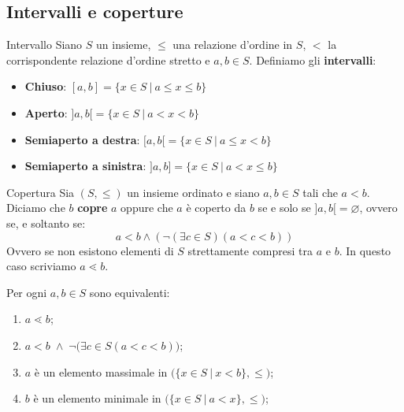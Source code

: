 \subsection{Intervalli e coperture}
\begin{defbox}{Intervallo}
	Siano $S$ un insieme, $\leq$ una relazione d'ordine in $S$, $<$ la corrispondente relazione d'ordine stretto e $a,b \in S$. Definiamo gli \textbf{intervalli}:
	\begin{itemize}
		\item \textbf{Chiuso}: $[a,b] = \{x \in S \ | \ a \leq x \leq b\}$
		\item \textbf{Aperto}: $]a,b[=\{x \in S \ | \ a < x < b\}$
		\item \textbf{Semiaperto a destra}: $[a,b[=\{x \in S \ | \ a \leq x < b\}$
		\item \textbf{Semiaperto a sinistra}: $]a,b]=\{x \in S \ | \ a < x \leq b\}$
	\end{itemize}
\end{defbox}

\begin{defbox}{Copertura}
	Sia $(S,\leq)$ un insieme ordinato e siano $a,b \in S$ tali che $a < b$.	Diciamo che $b$ \textbf{copre} $a$ oppure che $a$ è coperto da $b$ se e solo se $]a,b[= \varnothing$, ovvero se, e soltanto se:
	\begin{displaymath}
		a < b \land (\neg(\exists c \in S)(a < c < b))
	\end{displaymath}
	Ovvero se non esistono elementi di $S$ strettamente compresi tra $a$ e $b$. In questo caso scriviamo $a \lessdot b$.
\end{defbox}

\begin{lemmabox}
	Per ogni $a,b \in S$ sono equivalenti:
	\begin{enumerate}
		\item $a \lessdot b$;
		\item $a <b \; \wedge \; \neg\bigl(\exists c \in S (a <c<b)\bigr)$;
		\item $a$ è un elemento massimale in $\bigl(\{x \in S \ | \ x < b\}, \leq \bigr)$;
		\item $b$ è un elemento minimale in $\bigl(\{x \in S \ | \ a < x\}, \leq\bigr)$;
	\end{enumerate}
\end{lemmabox}

